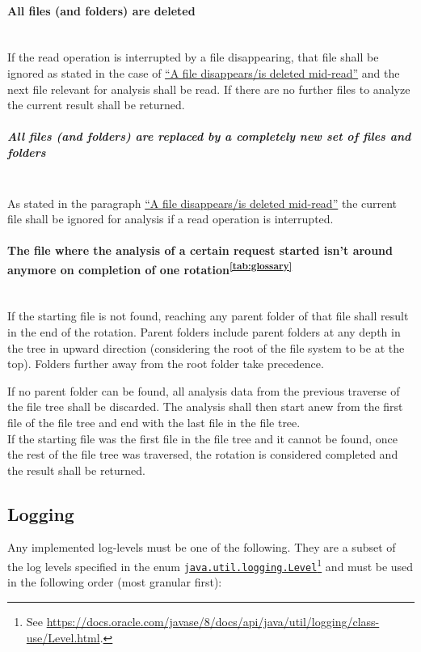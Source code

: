 \documentclass[11pt]{article} %
\begin{document}
    \paragraph{All files (and folders) are deleted}\label{par:everything_deleted} ~\\
    If the read operation is interrupted by a file disappearing, that file shall be ignored as stated in the case of \hyperref[par:file_disappear]{``A file disappears/is deleted mid-read''} and the next file relevant for analysis shall be read. If there are no further files to analyze the current result shall be returned.

    \subparagraph{All files (and folders) are replaced by a completely new set of files and folders} ~\\
    As stated in the paragraph \hyperref[par:file_disappear]{``A file disappears/is deleted mid-read''} the current file shall be ignored for analysis if a read operation is interrupted.

    \paragraph{The file where the analysis of a certain request started isn't around anymore on completion of one rotation\textsuperscript{\ref{tab:glossary}}} ~\\
    If the starting file is not found, reaching any parent folder of that file shall result in the end of the rotation. Parent folders include parent folders at any depth in the tree in upward direction (considering the root of the file system to be at the top). Folders further away from the root folder take precedence.

    If no parent folder can be found, all analysis data from the previous traverse of the file tree shall be discarded. The analysis shall then start anew from the first file of the file tree and end with the last file in the file tree.\\
    If the starting file was the first file in the file tree and it cannot be found, once the rest of the file tree was traversed, the rotation is considered completed and the result shall be returned.

    \subsection{Logging}\label{sec:3.3}

    Any implemented log-levels must be one of the following. They are a subset of the log levels specified in the enum \href{https://docs.oracle.com/javase/8/docs/api/java/util/logging/class-use/Level.html}{\texttt{java.util.logging.Level}}\footnote{See \url{https://docs.oracle.com/javase/8/docs/api/java/util/logging/class-use/Level.html}.} and must be used in the following order (most granular first):
\end{document}
